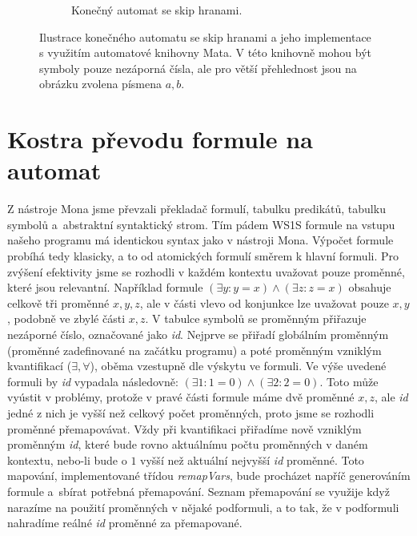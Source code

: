 \begin{figure}[ht]
\begin{subfigure}{.45\textwidth}
        \caption{Konečný automat se skip hranami.}
        \label{mata_skip_aut_aut}
    \end{subfigure}
    \caption{Ilustrace konečného automatu se skip hranami a jeho implementace s využitím automatové knihovny Mata. V této knihovně mohou být symboly pouze nezáporná čísla, ale pro větší přehlednost jsou na obrázku zvolena písmena $a,b$.}
    \label{mata_skip_aut}
\end{figure}

\section{Kostra převodu formule na automat}

Z nástroje Mona jsme převzali překladač formulí, tabulku predikátů, tabulku symbolů a~abstraktní syntaktický strom. Tím pádem WS1S formule na vstupu našeho programu má identickou syntax jako v nástroji Mona. Výpočet formule probíhá tedy klasicky, a to od atomických formulí směrem k hlavní formuli. Pro zvýšení efektivity jsme se rozhodli v každém kontextu uvažovat pouze proměnné, které jsou relevantní. Například formule $ (\exists y: y = x) \wedge (\exists z: z = x) $ obsahuje celkově tři proměnné $x,y,z$, ale v části vlevo od konjunkce lze uvažovat pouze $x,y$, podobně ve zbylé části $x,z$. V tabulce symbolů se proměnným přiřazuje nezáporné číslo, označované jako \textit{id}. Nejprve se přiřadí globálním proměnným (proměnné zadefinované na začátku programu) a poté proměnným vzniklým kvantifikací ($\exists, \forall$), oběma vzestupně dle výskytu ve formuli. Ve výše uvedené formuli by \textit{id} vypadala následovně: $ (\exists 1: 1 = 0) \wedge (\exists 2: 2 = 0) $. Toto může vyústit v problémy, protože v pravé části formule máme dvě proměnné $x,z$, ale \textit{id} jedné z nich je vyšší než celkový počet proměnných, proto jsme se rozhodli proměnné přemapovávat. Vždy při kvantifikaci přiřadíme nově vzniklým proměnným \textit{id}, které bude rovno aktuálnímu počtu proměnných v daném kontextu, nebo-li bude o $1$ vyšší než aktuální nejvyšší \textit{id} proměnné. Toto mapování, implementované třídou \textit{remapVars}, bude procházet napříč generováním formule a~sbírat potřebná přemapování. Seznam přemapování se využije když narazíme na použití proměnných v nějaké podformuli, a to tak, že v podformuli nahradíme reálné \textit{id} proměnné za přemapované.

